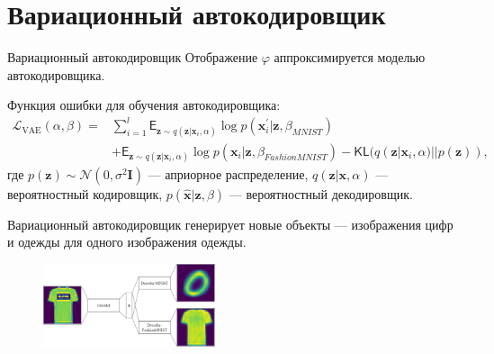 \documentclass[10pt,pdf,hyperref={unicode}]{beamer}
\begin{document}
\section{Вариационный автокодировщик}
\begin{frame}{Вариационный автокодировщик}
\justifying
Отображение $\varphi$ аппроксимируется моделью автокодировщика.

Функция ошибки для обучения автокодировщика:
\[
\begin{aligned}
    \mathcal{L}_{\text{VAE}}(\alpha, \beta)=&\sum\limits_{i=1}^{l}\mathsf{E}_{\mathbf{z}\sim q(\mathbf{z}|\mathbf{x}_{i}, \alpha)}\log{p(\mathbf{x}_{i}^{\prime}|\mathbf{z}, \beta_{MNIST})}\\
    &+\mathsf{E}_{\mathbf{z}\sim q(\mathbf{z}|\mathbf{x}_{i}, \alpha)}\log{p(\mathbf{x}_{i}|\mathbf{z}, \beta_{FashionMNIST})}-\mathsf{KL}(q(\mathbf{z}|\mathbf{x}_{i}, \alpha) || p(\mathbf{z})),
\end{aligned}
\]
где
$p(\mathbf{z})\sim \mathcal{N}(0,\sigma^{2}\mathbf{I})$ --- априорное распределение, $q(\mathbf{z}|\mathbf{x}, \alpha)$ --- вероятностный кодировщик, $p(\hat{\mathbf{x}}|\mathbf{z}, \beta)$ --- вероятностный декодировщик.

Вариационный автокодировщик генерирует новые объекты --- изображения цифр и одежды для одного изображения одежды.

\begin{figure}[h!]
\includegraphics[width=0.45\textwidth]{results/VAE.png}
\end{figure}

\end{frame}

\end{document}
